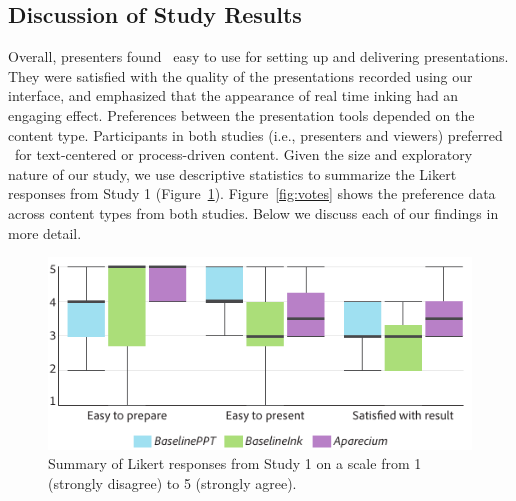 \subsection{Discussion of Study Results}

Overall, presenters found \interface\ easy to use for setting up and delivering presentations. They were satisfied with the quality of the presentations recorded using our interface, and emphasized that the appearance of real time inking had an engaging effect. 
Preferences between the presentation tools depended on the content type. Participants in both studies (i.e., presenters and viewers) preferred \interface\ for text-centered or process-driven content. 
%
Given the size and exploratory nature of our study, we use descriptive statistics to summarize the Likert responses from Study 1 (Figure~\ref{fig:likert}).
%
Figure~\ref{fig:votes} shows the preference data across content types from both studies.
%
Below we discuss each of our findings in more detail. 

\begin{figure}[t!]
    \centering
        \includegraphics[width=1\columnwidth]{figures/study1likert}
        \caption{Summary of Likert responses from Study 1 on a scale from 1 (strongly disagree) to 5 (strongly agree).}
\label{fig:likert}
\end{figure}


